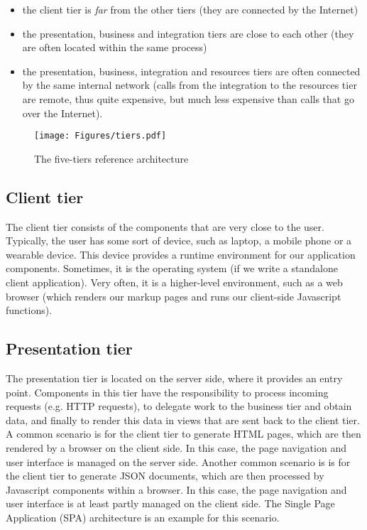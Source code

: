 \begin{itemize}
\item the client tier is \emph{far} from the other tiers (they are connected by the Internet)
\item the presentation, business and integration tiers are close to each other (they are often located within the same process)
\item the presentation, business, integration and resources tiers are often connected by the same internal network (calls from the integration to the resources tier are remote, thus quite expensive, but much less expensive than calls that go over the Internet).
\end{itemize}

\begin{figure}[]
	\centering
    \texttt{[image: Figures/tiers.pdf]}
	\caption{The five-tiers reference architecture}
  \label{fig:five-tiers}
\end{figure}

\subsection{Client tier}


The client tier consists of the components that are very close to the user. Typically, the user has some sort of device, such as laptop, a mobile phone or a wearable device. This device provides a runtime environment for our application components. Sometimes, it is the operating system (if we write a standalone client application). Very often, it is a higher-level environment, such as a web browser (which renders our markup pages and runs our client-side Javascript functions).

\subsection{Presentation tier}


The presentation tier is located on the server side, where it provides an entry point. Components in this tier have the responsibility to process incoming requests (e.g. HTTP requests), to delegate work to the business tier and obtain data, and finally to render this data in views that are sent back to the client tier. A common scenario is for the client tier to generate HTML pages, which are then rendered by a browser on the client side. In this case, the page navigation and user interface is managed on the server side. Another common scenario is is for the client tier to generate JSON documents, which are then processed by Javascript components within a browser. In this case, the page navigation and user interface is at least partly managed on the client side. The Single Page Application (SPA) architecture is an example for this scenario.

